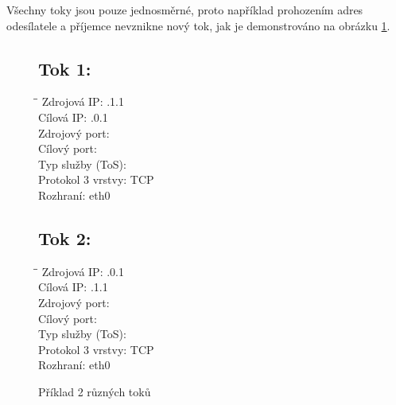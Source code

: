 \documentclass[11pt, a4paper, hidelinks]{article}[08.10.2023]
\begin{document}
    Všechny toky jsou pouze jednosměrné, proto například prohozením adres odesílatele a příjemce nevznikne
    nový tok, jak je demonstrováno na obrázku \ref{priklad1}.
    \vspace{2cm}

    \begin{figure}[h!]
        \begin{minipage}[t]{0.45\textwidth}
            \subsection*{Tok 1:}
            \begin{tabbing}
                \hspace*{4cm}\=\hspace*{4cm}\= \kill
                Zdrojová IP: .1.1 \\
                Cílová IP: .0.1 \\
                Zdrojový port:  \\
                Cílový port:  \\
                Typ služby (ToS):  \\
                Protokol 3 vrstvy: \> TCP \\
                Rozhraní: \> eth0 \\
            \end{tabbing}
        \end{minipage}
            \hfill
        \begin{minipage}[t]{0.45\textwidth}
            \subsection*{Tok 2:}
            \begin{tabbing}
                \hspace*{4cm}\=\hspace*{4cm}\= \kill
                Zdrojová IP: .0.1 \\
                Cílová IP: .1.1 \\
                Zdrojový port:  \\
                Cílový port:  \\
                Typ služby (ToS):  \\
                Protokol 3 vrstvy: \> TCP \\
                Rozhraní: \> eth0 \\
            \end{tabbing}
        \end{minipage}
        \caption{Příklad 2 různých toků}
        \label{priklad1}
    \end{figure}
\end{document}
